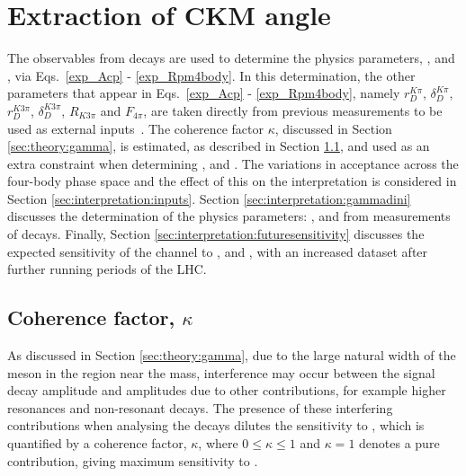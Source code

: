 \clearpage
%

\chapter{\label{ch:6-interpretation}Extraction of CKM angle \Pgamma} 


The \CP observables from \btodkst decays are used to determine the physics parameters, \rb, \deltab and \Pgamma, via Eqs.~\ref{exp_Acp} - \ref{exp_Rpm4body}. In this determination, the other parameters that appear in Eqs.~\ref{exp_Acp} - \ref{exp_Rpm4body}, namely $r_D^{K\pi}$, $\delta_D^{K\pi}$, $r_D^{K3\pi}$, $\delta_D^{K3\pi}$, $R_{K3\pi}$ and $F_{4\pi}$, are taken directly from previous measurements to be used as external inputs~\cite{HFAG,charmk3pi,charmk3pi_errata,LHCb-PAPER-2015-057,charm4pi}. The coherence factor $\kappa$, discussed in Section \ref{sec:theory:gamma}, is estimated, as described in Section \ref{sec:interpretation:coherence}, and used as an extra constraint when determining \rb, \deltab and \Pgamma. The variations in acceptance across the four-body phase space and the effect of this on the interpretation is considered in Section \ref{sec:interpretation:inputs}. Section \ref{sec:interpretation:gammadini} discusses the determination of the physics parameters: \rb, \deltab and \Pgamma from measurements of \btodkst decays. Finally, Section \ref{sec:interpretation:futuresensitivity} discusses the expected sensitivity of the \btodkst channel to \rb, \deltab and \Pgamma, with an increased dataset after further running periods of the LHC.

\section{Coherence factor, $\kappa$}
\label{sec:interpretation:coherence}

As discussed in Section \ref{sec:theory:gamma}, due to the large natural width of the \Kstarm meson in the region near the \Kstarm mass, interference may occur between the signal \Kstarm decay amplitude and amplitudes due to other \decay{\Bm}{\D\KS\pim} contributions, for example higher \KS\pim resonances and non-resonant decays. The presence of these interfering contributions when analysing the \btodkst decays dilutes the sensitivity to \Pgamma, which is quantified by a coherence factor, $\kappa$, where $0 \leq \kappa \leq 1$ and $\kappa = 1$ denotes a pure \Kstarm contribution, giving maximum sensitivity to \Pgamma. 

